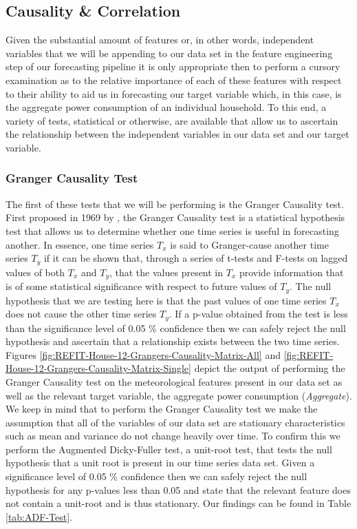 \subsection{Causality \& Correlation}
\label{subsec:Exploratory-Data-Analysis:Causality-and-Correlation}
Given the substantial amount of features or, in other words, independent variables that we will be appending to our data set in the feature engineering step of our forecasting pipeline it is only appropriate then to perform a cursory examination as to the relative importance of each of these features with respect to their ability to aid us in forecasting our target variable which, in this case, is the aggregate power consumption of an individual household. To this end, a variety of tests, statistical or otherwise, are available that allow us to ascertain the relationship between the independent variables in our data set and our target variable.

\subsubsection{Granger Causality Test}
\label{subsubsec:Exploratory-Data-Analysis:Causality-and-Correlation:Grangers-Causality-Test}
The first of these tests that we will be performing is the Granger Causality test. First proposed in 1969 by \citet{Granger}, the Granger Causality test is a statistical hypothesis test that allows us to determine whether one time series is useful in forecasting another. In essence, one time series $T_x$ is said to Granger-cause another time series $T_y$ if it can be shown that, through a series of t-tests and F-tests on lagged values of both $T_x$ and $T_y$, that the values present in $T_x$ provide information that is of some statistical significance with respect to future values of $T_y$. The null hypothesis that we are testing here is that the past values of one time series $T_x$ does not cause the other time series $T_y$. If a p-value obtained from the test is less than the significance level of 0.05 \% confidence then we can safely reject the null hypothesis and ascertain that a relationship exists between the two time series. Figures \ref{fig:REFIT-House-12-Grangers-Causality-Matrix-All} and \ref{fig:REFIT-House-12-Grangers-Causality-Matrix-Single} depict the output of performing the Granger Causality test on the meteorological features present in our data set as well as the relevant target variable, the aggregate power consumption (\textit{Aggregate}). We keep in mind that to perform the Granger Causality test we make the assumption that all of the variables of our data set are stationary \ie characteristics such as mean and variance do not change heavily over time. To confirm this we perform the Augmented Dicky-Fuller test, a unit-root test, that tests the null hypothesis that a unit root is present in our time series data set. Given a significance level of 0.05 \% confidence then we can safely reject the null hypothesis for any p-values less than 0.05 and state that the relevant feature does not contain a unit-root and is thus stationary. Our findings can be found in Table \ref{tab:ADF-Test}.

